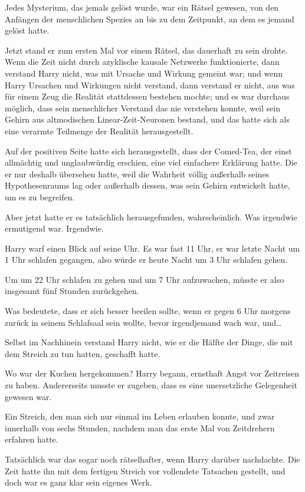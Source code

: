 {Jedes Mysterium, das jemals gelöst wurde, war ein Rätsel gewesen, von den Anfängen der menschlichen Spezies an bis zu dem Zeitpunkt, an dem es jemand gelöst hatte.

Jetzt stand er zum ersten Mal vor einem Rätsel, das dauerhaft zu sein drohte. Wenn die Zeit nicht durch azyklische kausale Netzwerke funktionierte, dann verstand Harry nicht, was mit Ursache und Wirkung gemeint war; und wenn Harry Ursachen und Wirkungen nicht verstand, dann verstand er nicht, aus was für einem Zeug die Realität stattdessen bestehen mochte; und es war durchaus möglich, dass sein menschlicher Verstand das nie verstehen konnte, weil sein Gehirn aus altmodischen Linear-Zeit-Neuronen bestand, und das hatte sich als eine verarmte Teilmenge der Realität herausgestellt.

Auf der positiven Seite hatte sich herausgestellt, dass der Comed-Tea, der einst allmächtig und unglaubwürdig erschien, eine viel einfachere Erklärung hatte. Die er nur deshalb übersehen hatte, weil die Wahrheit völlig außerhalb seines Hypothesenraums lag oder außerhalb dessen, was sein Gehirn entwickelt hatte, um es zu begreifen.

Aber jetzt hatte er es tatsächlich herausgefunden, wahrscheinlich. Was irgendwie ermutigend war. Irgendwie.

Harry warf einen Blick auf seine Uhr. Es war fast 11 Uhr, er war letzte Nacht um 1 Uhr schlafen gegangen, also würde er heute Nacht um 3 Uhr schlafen gehen.

Um um 22 Uhr schlafen zu gehen und um 7 Uhr aufzuwachen, müsste er also insgesamt fünf Stunden zurückgehen.

Was bedeutete, dass er sich besser beeilen sollte, wenn er gegen 6 Uhr morgens zurück in seinem Schlafsaal sein wollte, bevor irgendjemand wach war, und…

Selbst im Nachhinein verstand Harry nicht, wie er die Hälfte der Dinge, die mit dem Streich zu tun hatten, geschafft hatte.

Wo war der Kuchen hergekommen? Harry begann, ernsthaft Angst vor Zeitreisen zu haben. Andererseits musste er zugeben, dass es eine unersetzliche Gelegenheit gewesen war.

Ein Streich, den man sich nur einmal im Leben erlauben konnte, und zwar innerhalb von sechs Stunden, nachdem man das erste Mal von Zeitdrehern erfahren hatte.

Tatsächlich war das sogar noch rätselhafter, wenn Harry darüber nachdachte. Die Zeit hatte ihn mit dem fertigen Streich vor vollendete Tatsachen gestellt, und doch war es ganz klar sein eigenes Werk.

}
